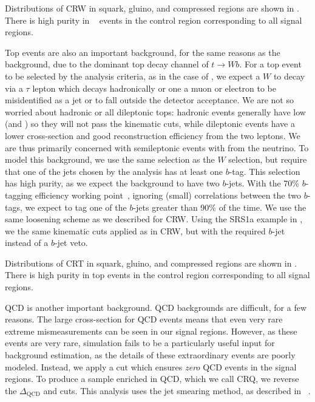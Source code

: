 Distributions of CRW in squark, gluino, and compressed regions are shown in .
There is high purity in \wjets~ events in the control region corresponding to all signal regions.

Top events are also an important background, for the same reasons as the \wjets~ background, due to the dominant top decay channel of $t \rightarrow Wb$.
For a top event to be selected by the analysis criteria, as in the case of \wjets, we expect a $W$ to decay via a $\tau$ lepton which decays hadronically or one a muon or electron to be misidentified as a jet or to fall outside the detector acceptance.
We are not so worried about hadronic or all dileptonic tops: hadronic \ttbar events generally have low \met (and ) so they will not pass the kinematic cuts, while dileptonic \ttbar events have a lower cross-section and good reconstruction efficiency from the two leptons.
We are thus primarily concerned with semileptonic \ttbar events with \met from the neutrino.
To model this background, we use the same selection as the $W$ selection, but require that one of the jets chosen by the analysis has at least one $b$-tag.
This selection has high purity, as we expect the \ttbar background to have two $b$-jets.
With the 70\% $b$-tagging efficiency working point~\cite{Aad:2015ydr,ATL-PHYS-PUB-2016-012}, ignoring (small) correlations between the two $b$-tags, we expect to tag one of the $b$-jets greater than 90\% of the time.
We use the same loosening scheme as we described for CRW.
Using the SRS1a example in , we the same kinematic cuts applied as in CRW, but with the required $b$-jet instead of a $b$-jet veto.

Distributions of CRT in squark, gluino, and compressed regions are shown in .
There is high purity in top events in the control region corresponding to all signal regions.

QCD is another important background.
QCD backgrounds are difficult, for a few reasons.
The large cross-section for QCD events means that even very rare extreme mismeasurements can be seen in our signal regions.
However, as these events are very rare, simulation fails to be a particularly useful input for background estimation, as the details of these extraordinary events are poorly modeled.
Instead, we apply a cut which ensures \textit{zero} QCD events in the signal regions.
To produce a sample enriched in QCD, which we call CRQ, we reverse the $\Delta_{\mathrm{QCD}}$ and  cuts.
This analysis uses the jet smearing method, as described in ~\cite{SUSY-2011-20}.

